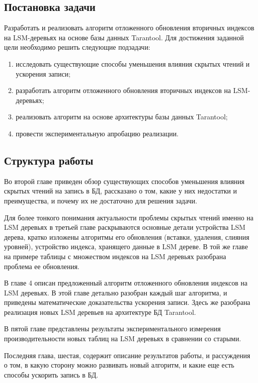 \documentclass[a4paper,hidelinks,12pt]{article}
\begin{document}
\subsection{Постановка задачи}
Разработать и реализовать алгоритм отложенного обновления вторичных индексов на
LSM-деревьях на основе базы данных Tarantool. Для достижения заданной цели
необходимо решить следующие подзадачи:
\begin{enumerate}
\item исследовать существующие способы уменьшения влияния скрытых чтений и
      ускорения записи;
\item разработать алгоритм отложенного обновления вторичных индексов на
      LSM-деревьях;
\item реализовать алгоритм на основе архитектуры базы данных Tarantool;
\item провести экспериментальную апробацию реализации.
\end{enumerate}

\subsection{Структура работы}
Во второй главе приведен обзор существующих способов уменьшения влияния скрытых
чтений на запись в БД, рассказано о том, какие у них недостатки и преимущества,
и почему их не достаточно для решения задачи.

Для более тонкого понимания актуальности проблемы скрытых чтений именно на LSM
деревьях в третьей главе раскрываются основные детали устройства LSM дерева,
кратко изложены алгоритмы его обновления (вставки, удаления, слияния уровней),
устройство индекса, хранящего данные в LSM дереве. В той же главе на примере
таблицы с множеством индексов на LSM деревьях разобрана проблема ее обновления.

В главе 4 описан предложенный алгоритм отложенного обновления индексов на LSM
деревьях. В этой главе детально разобран каждый шаг алгоритма, и приведены
математические доказательства ускорения записи. Здесь же разобрана реализация
новых LSM деревьев на архитектуре БД Tarantool.

В пятой главе представлены результаты экспериментального измерения
производительности новых таблиц на LSM деревьях в сравнении со старыми.

Последняя глава, шестая, содержит описание результатов работы, и рассуждения о
том, в какую сторону можно развивать новый алгоритм, и какие еще есть способы
ускорить запись в БД.
\end{document}
